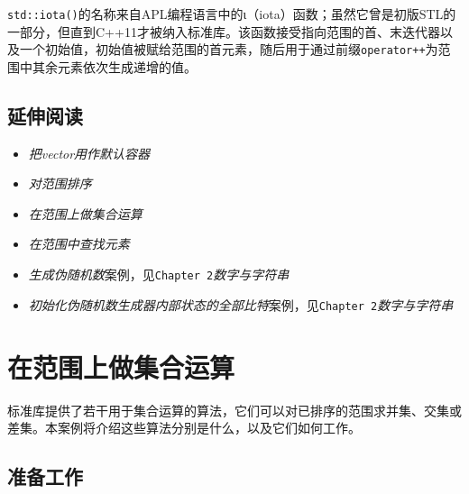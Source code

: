 
\texttt{std::\allowbreak{}iota()}的名称来自APL编程语言中的ι（iota）函数；虽然它曾是初版STL的一部分，但直到C++11才被纳入标准库。该函数接受指向范围的首、末迭代器以及一个初始值，初始值被赋给范围的首元素，随后用于通过前缀\texttt{operator++}为范围中其余元素依次生成递增的值。



\subsection{延伸阅读}



\begin{itemize}
\item \textit{把vector用作默认容器}



\item \textit{对范围排序}



\item \textit{在范围上做集合运算}



\item \textit{在范围中查找元素}



\item \textit{生成伪随机数}案例，见\texttt{Chapter 2}\textit{数字与}\textit{字符串}



\item \textit{初始化伪随机数生成器内部状态的全部比特}案例，见\texttt{Chapter 2}\textit{数字与字符串}

\end{itemize}



\section{在范围上做集合运算}


标准库提供了若干用于集合运算的算法，它们可以对已排序的范围求并集、交集或差集。本案例将介绍这些算法分别是什么，以及它们如何工作。



\subsection{准备工作}


